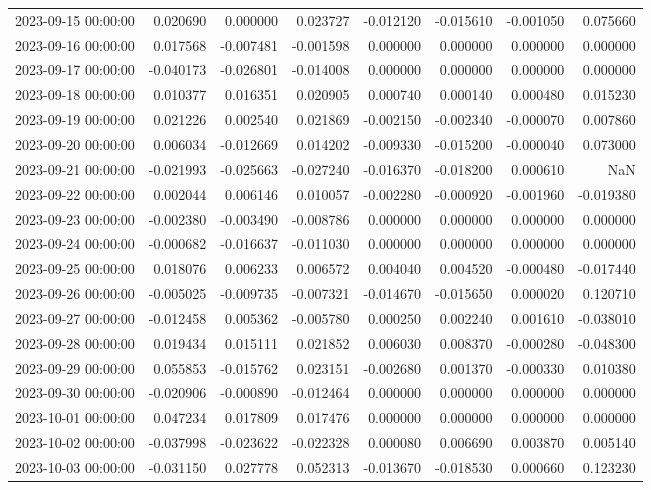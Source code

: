 \begin{tabular}{lrrrrrrr}
2023-09-15 00:00:00 & 0.020690 & 0.000000 & 0.023727 & -0.012120 & -0.015610 & -0.001050 & 0.075660 \\
2023-09-16 00:00:00 & 0.017568 & -0.007481 & -0.001598 & 0.000000 & 0.000000 & 0.000000 & 0.000000 \\
2023-09-17 00:00:00 & -0.040173 & -0.026801 & -0.014008 & 0.000000 & 0.000000 & 0.000000 & 0.000000 \\
2023-09-18 00:00:00 & 0.010377 & 0.016351 & 0.020905 & 0.000740 & 0.000140 & 0.000480 & 0.015230 \\
2023-09-19 00:00:00 & 0.021226 & 0.002540 & 0.021869 & -0.002150 & -0.002340 & -0.000070 & 0.007860 \\
2023-09-20 00:00:00 & 0.006034 & -0.012669 & 0.014202 & -0.009330 & -0.015200 & -0.000040 & 0.073000 \\
2023-09-21 00:00:00 & -0.021993 & -0.025663 & -0.027240 & -0.016370 & -0.018200 & 0.000610 & NaN \\
2023-09-22 00:00:00 & 0.002044 & 0.006146 & 0.010057 & -0.002280 & -0.000920 & -0.001960 & -0.019380 \\
2023-09-23 00:00:00 & -0.002380 & -0.003490 & -0.008786 & 0.000000 & 0.000000 & 0.000000 & 0.000000 \\
2023-09-24 00:00:00 & -0.000682 & -0.016637 & -0.011030 & 0.000000 & 0.000000 & 0.000000 & 0.000000 \\
2023-09-25 00:00:00 & 0.018076 & 0.006233 & 0.006572 & 0.004040 & 0.004520 & -0.000480 & -0.017440 \\
2023-09-26 00:00:00 & -0.005025 & -0.009735 & -0.007321 & -0.014670 & -0.015650 & 0.000020 & 0.120710 \\
2023-09-27 00:00:00 & -0.012458 & 0.005362 & -0.005780 & 0.000250 & 0.002240 & 0.001610 & -0.038010 \\
2023-09-28 00:00:00 & 0.019434 & 0.015111 & 0.021852 & 0.006030 & 0.008370 & -0.000280 & -0.048300 \\
2023-09-29 00:00:00 & 0.055853 & -0.015762 & 0.023151 & -0.002680 & 0.001370 & -0.000330 & 0.010380 \\
2023-09-30 00:00:00 & -0.020906 & -0.000890 & -0.012464 & 0.000000 & 0.000000 & 0.000000 & 0.000000 \\
2023-10-01 00:00:00 & 0.047234 & 0.017809 & 0.017476 & 0.000000 & 0.000000 & 0.000000 & 0.000000 \\
2023-10-02 00:00:00 & -0.037998 & -0.023622 & -0.022328 & 0.000080 & 0.006690 & 0.003870 & 0.005140 \\
2023-10-03 00:00:00 & -0.031150 & 0.027778 & 0.052313 & -0.013670 & -0.018530 & 0.000660 & 0.123230 \\

\end{tabular}
